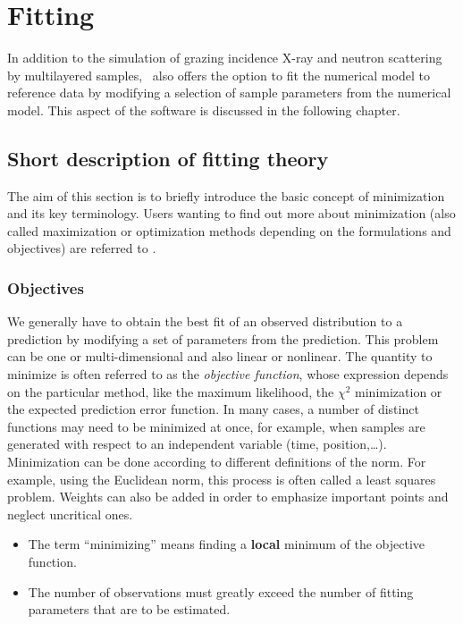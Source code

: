 \chapter{Fitting} 

In addition to the simulation of grazing incidence
X-ray and neutron scattering by
multilayered samples, \BornAgain\ also offers the option to
fit the numerical model to reference data by modifying a selection of
sample parameters from the numerical model.  This aspect
of the software is discussed in the following chapter.

\section{Short description of fitting theory}

The aim of this section is to briefly introduce the basic concept of
minimization and its key terminology. Users wanting to find out more about minimization (also called
maximization or optimization methods depending on the formulations and objectives) are referred to
\cite{Antoniou2007, mntutorial}.

\subsection{Objectives}
We generally have to obtain the best fit of an observed distribution
to a prediction by modifying a set of parameters from the
prediction. This problem can be one or multi-dimensional and also linear or
nonlinear. The quantity to minimize is often referred to as the
\textit{objective function}, whose expression depends on the
particular method, like the maximum likelihood, the $\chi^2$
minimization or the expected prediction error function. In many cases,
a number of distinct functions may need to be minimized at once, for
example, when samples are generated with respect to an independent variable (time,
position,\ldots). Minimization can be done according to different
definitions of the norm. For example, using the Euclidean norm, this process is
often called a least squares problem. Weights can also be added in
order to emphasize important points and neglect uncritical ones.\\

 
 {\begin{itemize}
\item The term ``minimizing'' means finding a \textbf{local} minimum of the objective function.
\item The number of observations must greatly exceed the number of fitting
  parameters that are to be estimated.
\end{itemize}}

